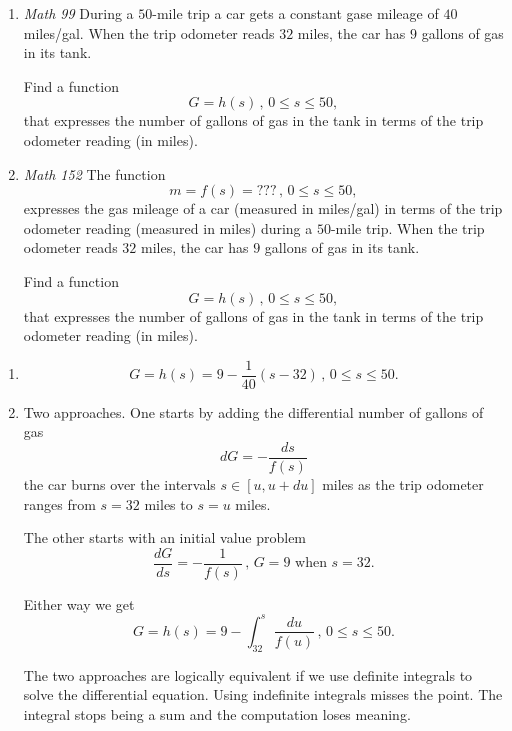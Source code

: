 \documentclass{ximera}
\begin{document}
\begin{example} \label{Exkr340}

\begin{enumerate}

\item \emph{Math 99} During a $50$-mile trip a car gets a constant gase mileage of $40$ miles/gal. When the trip odometer reads $32$ miles, the car has $9$ gallons of gas in its tank.

Find a function
\[
       G = h(s) \, , \, 0\leq s \leq 50 ,       
\]
that expresses the number of gallons of gas in the tank in terms of the trip odometer reading (in miles).


\item \emph{Math 152} The function 
\[
    m = f(s) = ??? \, , \, 0\leq s \leq 50 ,
\]
expresses the gas mileage of a car (measured in miles/gal) in terms of the trip odometer reading (measured in miles) during a $50$-mile trip. When the trip odometer reads $32$ miles, the car has $9$ gallons of gas in its tank.

Find a function
\[
     G = h(s) \, , \, 0\leq s \leq 50 ,
\]
that expresses the number of gallons of gas in the tank in terms of the trip odometer reading (in miles).

\end{enumerate}

\begin{explanation} 
\begin{enumerate}
\item 
\[
    G = h(s) = 9 - \frac{1}{40} \left( s-32  \right) \, , \, 0\leq s \leq 50. 
\]

\item Two approaches. One starts by adding the differential number of gallons of gas
\[
    dG = - \frac{ds}{f(s)}
\]
the car burns over the intervals $s \in [u, u+du]$ miles as the trip odometer ranges from $s=32$ miles to $s=u$ miles. 

The other starts with an initial value problem
\[
   \frac{dG}{ds} = - \frac{1}{f(s)} \, , \, G=9 \text{ when } s=32.
\]

Either way we get
\[
  G = h(s) = 9 - \int_{32}^s \frac{du}{f(u)} \, , \, 0\leq s \leq 50. 
\]

The two approaches are logically equivalent if we use definite integrals to solve the differential equation. Using indefinite integrals misses the point. The integral stops being a sum and the computation loses meaning.

\end{enumerate} 
\end{explanation}
\end{example}
\end{document}
